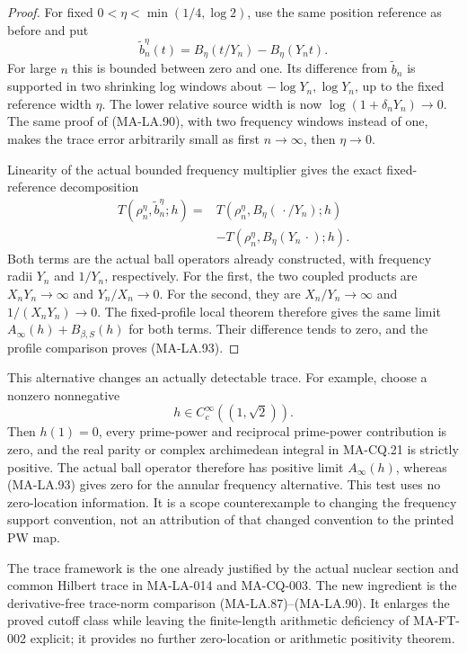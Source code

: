 \begin{proof}
For fixed \(0<\eta<\min(1/4,\log2)\), use the same
position reference as before and put
\[
 \widetilde b_n^\eta(t)
        =B_\eta(t/Y_n)-B_\eta(Y_nt).
 \tag{MA-LA.94}
\]
For large \(n\) this is bounded between zero and one.
Its difference from \(\widetilde b_n\) is supported
in two shrinking log windows about
\(-\log Y_n,\log Y_n\), up to the fixed reference
width \(\eta\).
The lower relative source width is now
\(\log(1+\delta_nY_n)\to0\).
The same proof of (MA-LA.90), with two frequency
windows instead of one, makes the trace error
arbitrarily small as first \(n\to\infty\), then
\(\eta\to0\).

Linearity of the actual bounded frequency multiplier
gives the exact fixed-reference decomposition
\[
 \begin{split}
 T(\rho_n^\eta,\widetilde b_n^\eta;h)
    ={}&T(\rho_n^\eta,B_\eta(\,\cdot/Y_n);h)\\
       &-T(\rho_n^\eta,B_\eta(Y_n\,\cdot);h).
 \end{split}
 \tag{MA-LA.95}
\]
Both terms are the actual ball operators already
constructed, with frequency radii \(Y_n\) and
\(1/Y_n\), respectively.
For the first, the two coupled products are
\(X_nY_n\to\infty\) and \(Y_n/X_n\to0\).
For the second, they are
\(X_n/Y_n\to\infty\) and \(1/(X_nY_n)\to0\).
The fixed-profile local theorem therefore gives
the same limit \(A_\infty(h)+B_{\beta,S}(h)\)
for both terms.
Their difference tends to zero, and the profile
comparison proves (MA-LA.93).
\end{proof}

This alternative changes an actually detectable trace.
For example, choose a nonzero nonnegative
\[
                   h\in C_c^\infty((1,\sqrt2)).
 \tag{MA-LA.96}
\]
Then \(h(1)=0\), every prime-power and reciprocal
prime-power contribution is zero, and the real
parity or complex archimedean integral in MA-CQ.21
is strictly positive.
The actual ball operator therefore has positive
limit \(A_\infty(h)\), whereas (MA-LA.93) gives
zero for the annular frequency alternative.
This test uses no zero-location information.
It is a scope counterexample to changing the
frequency support convention, not an attribution
of that changed convention to the printed PW map.

The trace framework is the one already justified
by the actual nuclear section and common Hilbert
trace in MA-LA-014 and MA-CQ-003.
The new ingredient is the derivative-free
trace-norm comparison (MA-LA.87)--(MA-LA.90).
It enlarges the proved cutoff class while leaving
the finite-length arithmetic deficiency of
MA-FT-002 explicit; it provides no further
zero-location or arithmetic positivity theorem.
